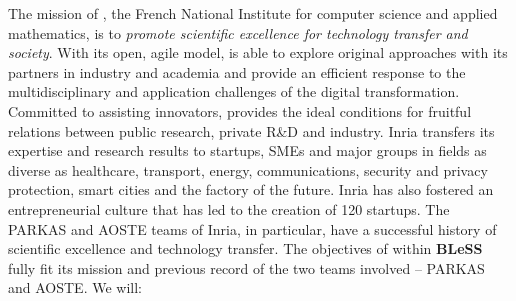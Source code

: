 \documentclass[a4paper,11pt]{article}
\newcommand{\project}[1]{\textbf{#1}\xspace}
\newcommand{\BLESS}{\project{BLeSS}}
\newcommand{\TheProject}{\BLESS}
\begin{document}
The mission of \INRIAshort, the French National Institute for computer
science and applied mathematics, is to {\em promote scientific
  excellence for technology transfer and society}. With its open,
agile model, \INRIAshort is able to explore original approaches with its
partners in industry and academia and provide an efficient response to
the multidisciplinary and application challenges of the digital
transformation. Committed to assisting innovators, \INRIA provides the
ideal conditions for fruitful relations between public research,
private R\&D and industry. Inria transfers its expertise and research
results to startups, SMEs and major groups in fields as diverse as
healthcare, transport, energy, communications, security and privacy
protection, smart cities and the factory of the future. Inria has also
fostered an entrepreneurial culture that has led to the creation of
120 startups. The PARKAS and AOSTE teams of Inria, in particular, have
a successful history of scientific excellence and technology transfer.
%
The objectives of \INRIA{} within \TheProject{} fully fit its mission and
previous record of the two teams involved -- PARKAS and AOSTE.
We will:
\end{document}
